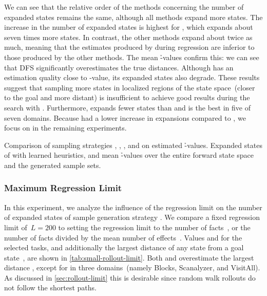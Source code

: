 We can see that the relative order of the methods concerning the number of expanded states remains the same, although all methods expand more states. The increase in the number of expanded states is highest for \hnnl{\dfs}, which expands about seven times more states. In contrast, the other methods expand about twice as much, meaning that the estimates produced by \dfs during regression are inferior to those produced by the other methods. The mean \h-values confirm this: we can see that DFS significantly overestimates the true distances. Although \bfs has an estimation quality close to \hstar-value, its expanded states also degrade. These results suggest that sampling more states in localized regions of the state space~(\bfs closer to the goal and \dfs more distant) is insufficient to achieve good results during the search with \gbfs. Furthermore, \hnnl{\bfsrw} expands fewer states than \hnnl{\rw} and is the best in five of seven domains. Because \hnnl{\bfsrw} had a lower increase in expansions compared to \hnnl{\rw}, we focus on \bfsrw in the remaining experiments.

\begin{table}[tb]
    \caption[Comparison of sampling strategies on estimated \h-values.]{Comparison of sampling strategies \bfs, \dfs, \rw, and \bfsrw on estimated \h-values. Expanded states of \gbfs with learned heuristics, and mean \h-values over the entire forward state space and the generated sample sets.}
    \label{tab:small-sampling-h}
    \addmargin
    \centering
    
\end{table}

\subsubsection{Maximum Regression Limit}
\label{sec:small-exps-rollout-limit}

In this experiment, we analyze the influence of the regression limit on the number of expanded states of sample generation strategy \bfsrw. We compare a fixed regression limit of~$L=200$ to setting the regression limit to the number of facts~\facts, or the number of facts divided by the mean number of effects~\meanfx. Values \facts and \meanfx for the selected tasks, and additionally the largest distance of any state from a goal state~\ssdiameter, are shown in \cref{tab:small-rollout-limit}. Both \facts and \meanfx overestimate the largest distance \ssdiameter, except for \meanfx in three domains~(namely Blocks, Scanalyzer, and VisitAll). As discussed in \cref{sec:rollout-limit} this is desirable since random walk rollouts do not follow the shortest paths.

